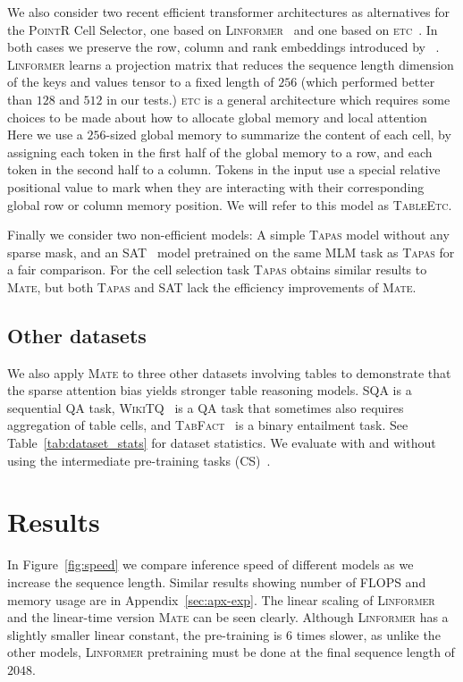 \documentclass[11pt]{article}
\newcommand\sqa{\textsc{SQA}\xspace}
\newcommand\tabfact{\textsc{TabFact}\xspace}
\newcommand\wtq{\textsc{WikiTQ}\xspace}
\newcommand{\pointr}{\textsc{PointR}\xspace}
\newcommand{\etc}{\textsc{etc}\xspace}
\newcommand{\tableetc}{\textsc{TableEtc}\xspace}
\newcommand{\tapas}{\textsc{Tapas}\xspace}
\newcommand{\linformer}{\textsc{Linformer}\xspace}
\newcommand{\sat}{\textsc{SAT}\xspace}
\newcommand{\model}{\textsc{Mate}\xspace}
\begin{document}
We also consider two recent efficient transformer architectures as alternatives for the \pointr Cell Selector,
one based on \linformer~\cite{wang2020linformer} and one based on \etc~\cite{ainslie-etal-2020-etc}. In both cases we preserve the row, column and rank embeddings introduced
by ~\citet{herzig-etal-2020-tapas}.
\linformer learns a projection matrix that reduces the sequence length dimension of the keys and values tensor to a fixed length of $256$ (which performed better than $128$ and $512$ in our tests.)
\etc is a general architecture which requires some choices to be made about how to allocate global memory and local attention~\cite{dai-etal-2019-transformer}
Here we use a $256$-sized global memory to summarize the content of each cell, by assigning each token in the first half of the global memory to a row,
and each token in the second half to a column.
Tokens in the input use a special
relative positional value to mark when they are interacting with their corresponding
global row or column memory position. We will refer to this model as \tableetc.

Finally we consider two non-efficient models: A simple \tapas model without any sparse mask, and an \sat~\cite{zhang-etal-2020-table} model pretrained on the same MLM task as \tapas for a fair comparison. For the cell selection task \tapas obtains similar results to \model, but both \tapas and \sat lack the efficiency improvements of \model.  
\subsection{Other datasets}

We also apply \model to three other datasets involving tables to demonstrate that the sparse attention bias yields stronger table reasoning models.
\sqa \cite{iyyer-etal-2017-search} is a sequential QA task, \wtq~\cite{pasupat2015compositional} is a QA task that sometimes also requires aggregation of table cells, and \tabfact~\cite{Chen2020TabFact} is a binary entailment task. See Table~\ref{tab:dataset_stats} for dataset statistics. 
We evaluate with and without using the intermediate pre-training tasks (CS)~\cite{eisenschlos-etal-2020-understanding}. \section{Results}
\label{sec:results}

In Figure~\ref{fig:speed} we compare inference speed of different models as we increase the sequence length. 
Similar results showing number of FLOPS and memory usage are in Appendix~\ref{sec:apx-exp}.
The linear scaling of \linformer and the linear-time version \model can be seen clearly.
Although \linformer has a slightly smaller linear constant, the pre-training is 6 times slower, as unlike the other models, \linformer pretraining must be done at the final sequence length of $2048$.
\end{document}
